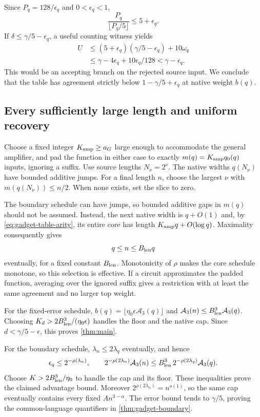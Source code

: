 \documentclass[11pt,letterpaper]{article}
\theoremstyle{definition}
\theoremstyle{remark}
\begin{document}
Since $P_q=128/\epsilon_q$ and $0<\epsilon_q<1$,
\[
 \frac{P_q}{\lfloor P_q/5\rfloor}\le5+\epsilon_q.
\]
If $\delta\le\gamma/5-\epsilon_q$, a useful counting witness yields
\begin{align*}
 U&\le(5+\epsilon_q)(\gamma/5-\epsilon_q)+10\omega_q\\
  &\le\gamma-4\epsilon_q+10\epsilon_q/128
   <\gamma-\epsilon_q.
\end{align*}
This would be an accepting branch on the rejected source input.
We conclude that the table has agreement strictly below
$1-\gamma/5+\epsilon_q$ at native weight $b(q)$.

\subsection{Every sufficiently large length and uniform recovery}
\label{sec:all-lengths}

Choose a fixed integer $K_{\rm amp}\ge a_G$ large enough
to accommodate the general amplifier, and pad the function in either
case to exactly $m(q)=K_{\rm amp}q_0(q)$ inputs, ignoring a suffix.
Use source lengths $N_\nu=2^\nu$. The native widths $q(N_\nu)$ have
bounded additive jumps. For a final length $n$, choose the largest $\nu$
with $m(q(N_\nu))\le n/2$. When none exists, set the slice to zero.

The boundary schedule can have jumps, so bounded additive gaps in
$m(q)$ should not be assumed. Instead, the next native width is
$q+O(1)$ and, by \cref{eq:gadget-table-arity}, its entire core has
length $K_{\rm amp}q+O(\log q)$. Maximality consequently gives
\[
 q\le n\le B_{\rm len}q
\]
eventually, for a fixed constant $B_{\rm len}$. Monotonicity of $\rho$
makes the core schedule monotone, so this selection is effective.
If a circuit approximates the padded function, averaging over the
ignored suffix gives a restriction with at least the same agreement
and no larger top weight.

For the fixed-error schedule, $b(q)=\lfloor\eta_0\epsilon
\mathcal A_3(q)\rfloor$ and
$\mathcal A_3(n)\le B_{\rm len}^3\mathcal A_3(q)$. Choosing
$K_d>2B_{\rm len}^3/(\eta_0\epsilon)$ handles the floor and the native cap.
Since $d<\gamma/5-\epsilon$, this proves
\cref{thm:main}.

For the boundary schedule, $\lambda_n\le2\lambda_q$ eventually,
and hence
\[
 \epsilon_q\le2^{-\rho(\lambda_n)},\qquad
 2^{-\rho(2\lambda_n)}\mathcal A_3(n)
 \le B_{\rm len}^3\,2^{-\rho(2\lambda_q)}\mathcal A_3(q).
\]
Choose $K>2B_{\rm len}^3/\eta_0$ to handle the cap and its floor. These
inequalities prove the claimed advantage bound. Moreover
$2^{\rho(2\lambda_n)}=n^{o(1)}$, so the same cap eventually
contains every fixed $An^{3-\alpha}$. The error bound tends
to $\gamma/5$, proving the common-language quantifiers in
\cref{thm:gadget-boundary}.
\end{document}

